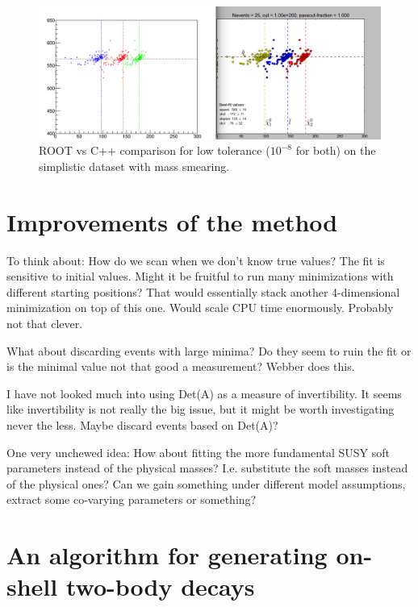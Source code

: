 \documentclass[twoside,english]{uiofysmaster}
\begin{document}
\begin{figure}
	\centering
	\includegraphics[width=\textwidth]{figures/making-sense/simplistic_with_mass_smearing_comparison.png}
	\caption{ROOT vs C++ comparison for low tolerance ($10^{-8}$ for both) on the simplistic dataset with mass smearing.}
\end{figure}



\chapter{Improvements of the method}
To think about: How do we scan when we don't know true values? The fit is sensitive to initial values. Might it be fruitful to run many minimizations with different starting positions? That would essentially stack another 4-dimensional minimization on top of this one. Would scale CPU time enormously. Probably not that clever.

What about discarding events with large minima? Do they seem to ruin the fit or is the minimal value not that good a measurement? Webber does this. 

I have not looked much into using Det(A) as a measure of invertibility. It seems like invertibility is not really the big issue, but it might be worth investigating never the less. Maybe discard events based on Det(A)?

One very unchewed idea: How about fitting the more fundamental SUSY soft parameters instead of the physical masses? I.e. substitute the soft masses instead of the physical ones? Can we gain something under different model assumptions, extract some co-varying parameters or something?

\appendix

\chapter{An algorithm for generating on-shell two-body decays}
\label{ch:decayalgorithm}
\end{document}

